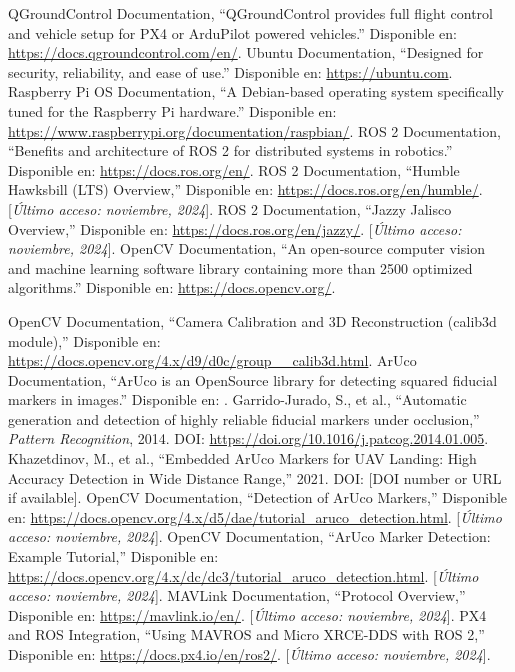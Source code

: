 \begin{thebibliography}{30}
     QGroundControl Documentation, ``QGroundControl provides full flight control and vehicle setup for PX4 or ArduPilot powered vehicles.'' Disponible en: \url{https://docs.qgroundcontrol.com/en/}. 
     Ubuntu Documentation, ``Designed for security, reliability, and ease of use.'' Disponible en: \url{https://ubuntu.com}. 
     Raspberry Pi OS Documentation, ``A Debian-based operating system specifically tuned for the Raspberry Pi hardware.'' Disponible en: \url{https://www.raspberrypi.org/documentation/raspbian/}.
     ROS 2 Documentation, ``Benefits and architecture of ROS 2 for distributed systems in robotics.'' Disponible en: \url{https://docs.ros.org/en/}. 
    ROS 2 Documentation, ``Humble Hawksbill (LTS) Overview,'' Disponible en: \url{https://docs.ros.org/en/humble/}. [\textit{Último acceso: noviembre, 2024}].
    ROS 2 Documentation, ``Jazzy Jalisco Overview,'' Disponible en: \url{https://docs.ros.org/en/jazzy/}. [\textit{Último acceso: noviembre, 2024}].
   OpenCV Documentation, ``An open-source computer vision and machine learning software library containing more than 2500 optimized algorithms.'' Disponible en: \url{https://docs.opencv.org/}. 

   
   
    OpenCV Documentation, ``Camera Calibration and 3D Reconstruction (calib3d module),'' Disponible en: \url{https://docs.opencv.org/4.x/d9/d0c/group__calib3d.html}.
     ArUco Documentation, ``ArUco is an OpenSource library for detecting squared fiducial markers in images.'' Disponible en: \url{}. 
    Garrido-Jurado, S., et al., ``Automatic generation and detection of highly reliable fiducial markers under occlusion,'' \textit{Pattern Recognition}, 2014. DOI: \url{https://doi.org/10.1016/j.patcog.2014.01.005}.
     Khazetdinov, M., et al., ``Embedded ArUco Markers for UAV Landing: High Accuracy Detection in Wide Distance Range,'' 2021. DOI: [DOI number or URL if available].
    OpenCV Documentation, ``Detection of ArUco Markers,'' Disponible en: \url{https://docs.opencv.org/4.x/d5/dae/tutorial_aruco_detection.html}. [\textit{Último acceso: noviembre, 2024}].
    OpenCV Documentation, ``ArUco Marker Detection: Example Tutorial,'' Disponible en: \url{https://docs.opencv.org/4.x/dc/dc3/tutorial_aruco_detection.html}. [\textit{Último acceso: noviembre, 2024}].
    MAVLink Documentation, ``Protocol Overview,'' Disponible en: \url{https://mavlink.io/en/}. [\textit{Último acceso: noviembre, 2024}].
    PX4 and ROS Integration, ``Using MAVROS and Micro XRCE-DDS with ROS 2,'' Disponible en: \url{https://docs.px4.io/en/ros2/}. [\textit{Último acceso: noviembre, 2024}].


\end{thebibliography}
